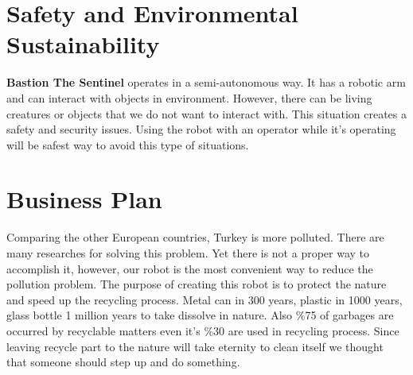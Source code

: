 \documentclass[12pt,a4paper]{article}
\begin{document}
  
 \section{Safety and Environmental Sustainability}
  \begin{flushleft}
   \textbf{Bastion The Sentinel} operates in a semi-autonomous way. It has a robotic arm and can interact 
   with objects in environment. However, there can be living creatures or objects that we do not want to 
   interact with. This situation creates a safety and security issues. Using the robot with an operator 
   while it's operating will be safest way to avoid this type of situations. 
  \end{flushleft}

 \section{Business Plan}
 \begin{flushleft}
  Comparing the other European countries, Turkey is more polluted. There are many researches for solving 
  this problem. Yet there is not a proper way to accomplish it, however, our robot is the most convenient 
  way to reduce the pollution problem. The purpose of creating this robot is to protect the nature and 
  speed up the recycling process. Metal can in 300 years, plastic in 1000 years, glass bottle 1 million 
  years to take dissolve in nature. Also \%75 of garbages are occurred by recyclable matters even it's \%30 
  are used in recycling process. Since leaving recycle part to the nature will take eternity to clean itself 
  we thought that someone should step up and do something. \\

 \end{flushleft}
\end{document}
